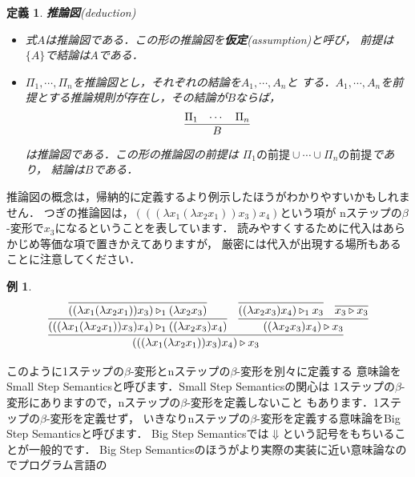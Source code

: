 \documentclass{ltjsbook}%
\newtheorem{definition}{定義}[section]%
\newtheorem{example}{例}[section]%
\newcommand\term[2]{\textbf{#1}{(\textit{#2})}}%
\begin{document}
\begin{definition}%
\term{推論図}{deduction}%
\begin{itemize}%
\item 式$A$は推論図である．この形の推論図を\term{仮定}{assumption}と呼び，%
  前提は$\{A\}$で結論は$A$である．%
\item $\Pi_1,\cdots,\Pi_n$を推論図とし，それぞれの結論を$A_1,\cdots,A_n$と%
  する．$A_1,\cdots,A_n$を前提とする推論規則が存在し，その結論が$B$ならば，%
  \begin{equation}%
    \infer{B}{\Pi_1&\cdots&\Pi_n}%
  \end{equation}%
  は推論図である．この形の推論図の前提は%
  $\Pi_1の前提\cup\cdots\cup\Pi_nの前提$であり，%
  結論は$B$である．%
\end{itemize}%
\end{definition}%
推論図の概念は，帰納的に定義するより例示したほうがわかりやすいかもしれません．%
つぎの推論図は，$(((\lambda x_1(\lambda x_2 x_1))x_3)x_4)$という項が%
nステップの$\beta$-変形で$x_3$になるということを表しています．%
読みやすくするために代入はあらかじめ等価な項で置きかえてありますが，%
厳密には代入が出現する場所もあることに注意してください．%
\begin{example}%
  \begin{equation}%
    \infer{%
      (((\lambda x_1(\lambda x_2 x_1))x_3)x_4)\triangleright x_3%
    }{%
      \infer{%
        (((\lambda x_1(\lambda x_2 x_1))x_3)x_4)\triangleright_1%
        ((\lambda x_2 x_3)x_4)%
      }{%
        \infer{%
          ((\lambda x_1(\lambda x_2 x_1))x_3)\triangleright_1%
          (\lambda x_2 x_3)%
        }{%
        }%
      }%
    &%
      \infer{%
        ((\lambda x_2 x_3)x_4)\triangleright x_3%
      }{%
        \infer{%
          ((\lambda x_2 x_3)x_4)\triangleright_1x_3%
        }{%
        }%
      &%
        \infer{%
          x_3\triangleright x_3%
        }{%
        }%
      }%
    }%
  \end{equation}%
\end{example}%
\par このように1ステップの$\beta$-変形とnステップの$\beta$-変形を別々に定義する%
意味論をSmall Step Semanticsと呼びます．Small Step Semanticsの関心は%
1ステップの$\beta$-変形にありますので，nステップの$\beta$-変形を定義しないこと%
もあります．1ステップの$\beta$-変形を定義せず，%
いきなりnステップの$\beta$-変形を定義する意味論をBig Step Semanticsと呼びます．%
Big Step Semanticsでは$\Downarrow$という記号をもちいることが一般的です．%
Big Step Semanticsのほうがより実際の実装に近い意味論なのでプログラム言語の%
\end{document}
